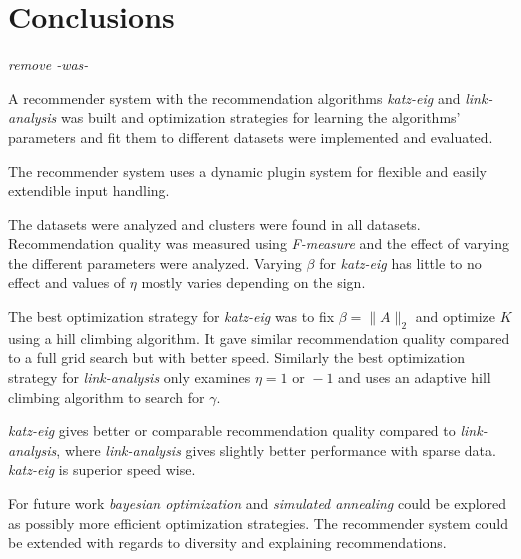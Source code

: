 \chapter{Conclusions}\label{cha:conclusions}

\textit{remove -was- }

A recommender system with the recommendation algorithms \textit{katz-eig} and \textit{link-analysis} was built and optimization strategies for learning the algorithms' parameters and fit them to different datasets were implemented and evaluated.

The recommender system uses a dynamic plugin system for flexible and easily extendible input handling.

The datasets were analyzed and clusters were found in all datasets. Recommendation quality was measured using \textit{F-measure} and the effect of varying the different parameters were analyzed.  Varying $\beta$ for \textit{katz-eig} has little to no effect and values of $\eta$ mostly varies depending on the sign.

The best optimization strategy for \textit{katz-eig} was to fix $\beta = \| A \|_2$ and optimize $K$ using a hill climbing algorithm. It gave similar recommendation quality compared to a full grid search but with better speed. Similarly the best optimization strategy for \textit{link-analysis} only examines $\eta = 1 \text{ or } -1$ and uses an adaptive hill climbing algorithm to search for $\gamma$.

\textit{katz-eig} gives better or comparable recommendation quality compared to \textit{link-analysis}, where \textit{link-analysis} gives slightly better performance with sparse data. \textit{katz-eig} is superior speed wise.

For future work \textit{bayesian optimization} and \textit{simulated annealing} could be explored as possibly more efficient optimization strategies.  The recommender system could be extended with regards to diversity and explaining recommendations.

